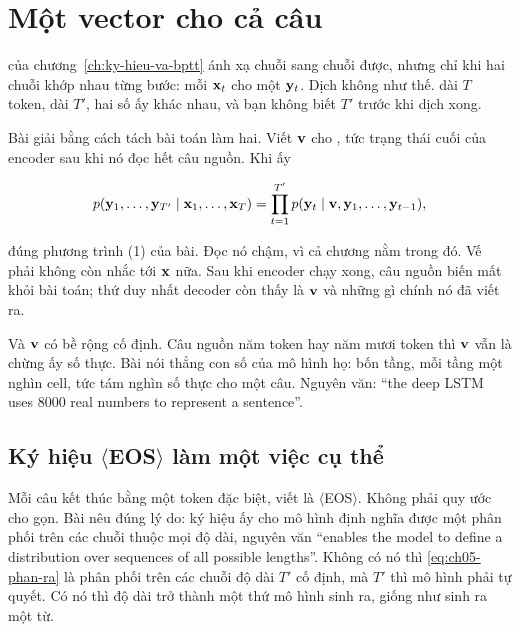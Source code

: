 \section{Một vector cho cả câu}
\label{sec:ch05-mot-vector}

%
 của chương~\ref{ch:ky-hieu-va-bptt}
ánh xạ chuỗi sang chuỗi được, nhưng chỉ khi hai chuỗi khớp nhau từng bước: mỗi
\(\mathbf{x}_t\) cho một \(\mathbf{y}_t\). Dịch không như thế.
 dài \(T\) token,
 dài \(T'\), hai số ấy khác nhau, và bạn không
biết \(T'\) trước khi dịch xong.

Bài giải bằng cách tách bài toán làm hai. Viết \(\mathbf{v}\) cho
, tức trạng thái cuối của encoder sau khi
nó đọc hết câu nguồn. Khi ấy

\begin{equation}
  p(\mathbf{y}_1, \dots, \mathbf{y}_{T'} \mid \mathbf{x}_1, \dots, \mathbf{x}_T)
  = \prod_{t=1}^{T'} p(\mathbf{y}_t \mid \mathbf{v}, \mathbf{y}_1, \dots, \mathbf{y}_{t-1}),
  \label{eq:ch05-phan-ra}
\end{equation}

đúng phương trình (1) của bài. Đọc nó chậm, vì cả chương nằm trong đó. Vế phải
không còn nhắc tới \(\mathbf{x}\) nữa. Sau khi encoder chạy xong, câu nguồn biến
mất khỏi bài toán; thứ duy nhất decoder còn thấy là \(\mathbf{v}\) và những gì
chính nó đã viết ra.

%
Và \(\mathbf{v}\) có bề rộng cố định. Câu nguồn năm token hay năm mươi token thì
\(\mathbf{v}\) vẫn là chừng ấy số thực. Bài nói thẳng con số của mô hình họ: bốn
tầng, mỗi tầng một nghìn cell, tức tám nghìn số thực cho một câu. Nguyên văn:
\enquote{the deep LSTM uses 8000 real numbers to represent a sentence}.

\subsection*{Ký hiệu \(\langle\)EOS\(\rangle\) làm một việc cụ thể}

%
Mỗi câu kết thúc bằng một token đặc biệt, viết là \(\langle\)EOS\(\rangle\).
Không phải quy ước cho gọn. Bài nêu đúng lý do: ký hiệu ấy cho mô hình định
nghĩa được một phân phối trên các chuỗi thuộc mọi độ dài, nguyên văn
\enquote{enables the model to define a distribution over sequences of all
possible lengths}. Không có nó thì
\eqref{eq:ch05-phan-ra} là phân phối trên các chuỗi độ dài \(T'\) cố định, mà
\(T'\) thì mô hình phải tự quyết. Có nó thì độ dài trở thành một thứ mô hình
sinh ra, giống như sinh ra một từ.

